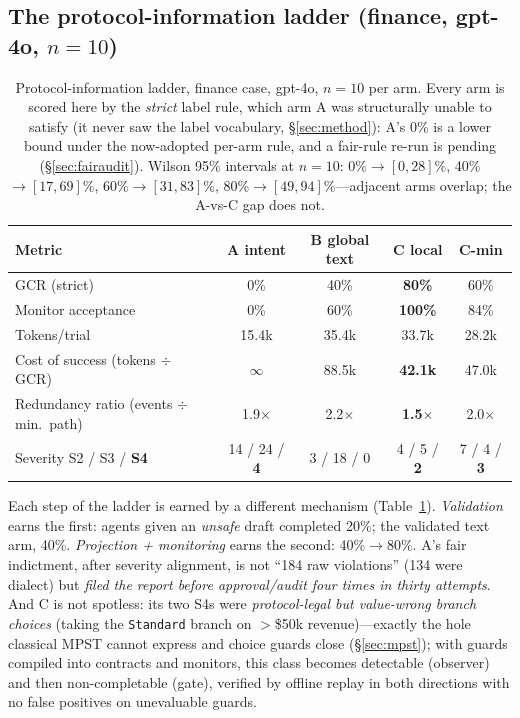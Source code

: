 \documentclass{article}
\begin{document}
\subsection{The protocol-information ladder (finance, gpt-4o, $n{=}10$)}
\begin{table}[t]
\centering\small
\caption{Protocol-information ladder, finance case, gpt-4o, $n{=}10$ per arm. Every arm is scored here by the \emph{strict} label rule, which arm A was structurally unable to satisfy (it never saw the label vocabulary, \S\ref{sec:method}): A's 0\% is a lower bound under the now-adopted per-arm rule, and a fair-rule re-run is pending (\S\ref{sec:fairaudit}). Wilson 95\% intervals at $n{=}10$: 0\%$\to[0,28]\%$, 40\%$\to[17,69]\%$, 60\%$\to[31,83]\%$, 80\%$\to[49,94]\%$---adjacent arms overlap; the A-vs-C gap does not.}
\label{tab:ladder}
\begin{tabular}{@{}lcccc@{}}
\toprule
\textbf{Metric} & \textbf{A intent} & \textbf{B global text} & \textbf{C local} & \textbf{C-min} \\
\midrule
GCR (strict) & 0\% & 40\% & \textbf{80\%} & 60\% \\
Monitor acceptance & 0\% & 60\% & \textbf{100\%} & 84\% \\
Tokens/trial & 15.4k & 35.4k & 33.7k & 28.2k \\
Cost of success (tokens $\div$ GCR) & $\infty$ & 88.5k & \textbf{42.1k} & 47.0k \\
Redundancy ratio (events $\div$ min.\ path) & 1.9$\times$ & 2.2$\times$ & \textbf{1.5}$\times$ & 2.0$\times$ \\
\midrule
Severity S2 / S3 / \textbf{S4} & 14 / 24 / \textbf{4} & 3 / 18 / 0 & 4 / 5 / \textbf{2} & 7 / 4 / \textbf{3} \\
\bottomrule
\end{tabular}
\end{table}
Each step of the ladder is earned by a different mechanism (Table~\ref{tab:ladder}). \emph{Validation} earns the first: agents given an \emph{unsafe} draft completed 20\%; the validated text arm, 40\%. \emph{Projection + monitoring} earns the second: 40\%$\to$80\%. A's fair indictment, after severity alignment, is not ``184 raw violations'' (134 were dialect) but \emph{filed the report before approval/audit four times in thirty attempts}. And C is not spotless: its two S4s were \emph{protocol-legal but value-wrong branch choices} (taking the \texttt{Standard} branch on $>$\$50k revenue)---exactly the hole classical MPST cannot express and choice guards close (\S\ref{sec:mpst}); with guards compiled into contracts and monitors, this class becomes detectable (observer) and then non-completable (gate), verified by offline replay in both directions with no false positives on unevaluable guards.
\end{document}
